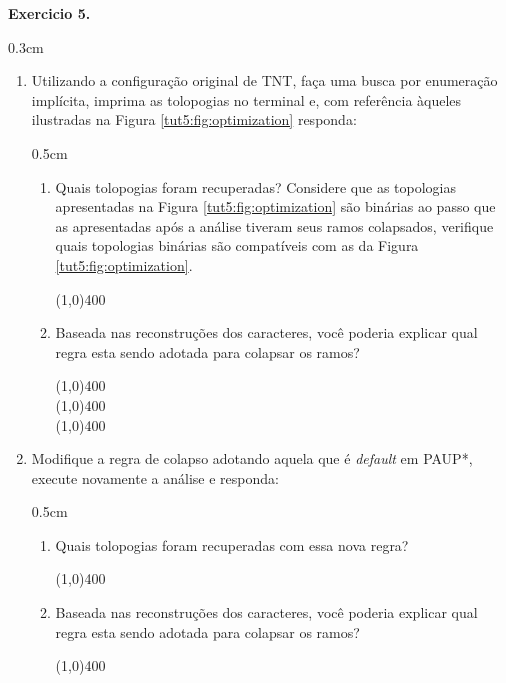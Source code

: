 \begin{refsection}
\begin{blackBlock}{\textbf{Exercicio 5.}}
\end{blackBlock}


  \begin {myindentpar}{0.3cm}
  \begin{enumerate}[\itshape i.]
	\item{Utilizando a configuração original de TNT, faça uma busca por enumeração implícita, imprima as tolopogias no terminal e, com referência àqueles ilustradas na Figura \ref{tut5:fig:optimization} responda:}
	  \begin {myindentpar}{0.5cm}
	  \begin{enumerate}[\itshape a.]
		\item{Quais tolopogias foram recuperadas? Considere que as topologias apresentadas na Figura \ref{tut5:fig:optimization} são binárias ao passo que as apresentadas após a análise tiveram seus ramos colapsados, verifique quais topologias binárias são compatíveis com as da Figura \ref{tut5:fig:optimization}.}
			\begin{center}
			\line(1,0){400}\\
			\end{center}
		\item{Baseada nas reconstruções dos caracteres, você poderia explicar qual regra esta sendo adotada para colapsar os ramos?}
			\begin{center}
			\line(1,0){400}\\
			\line(1,0){400}\\
			\line(1,0){400}\\
			\end{center}
	  \end{enumerate}
	  \end{myindentpar}
	\item{Modifique a regra de colapso adotando aquela que é \textit{default} em PAUP*, execute novamente a análise e responda:}
	  \begin {myindentpar}{0.5cm}
	  \begin{enumerate}[\itshape a.]
		\item{Quais tolopogias foram recuperadas com essa nova regra?}
			\begin{center}
			\line(1,0){400}\\
			\end{center}
		\item{Baseada nas reconstruções dos caracteres, você poderia explicar qual regra esta sendo adotada para colapsar os ramos?}
			\begin{center}
			\line(1,0){400}\\

\end{center}
\end{enumerate}
\end{myindentpar}
\end{enumerate}
\end{myindentpar}
\end{refsection}
